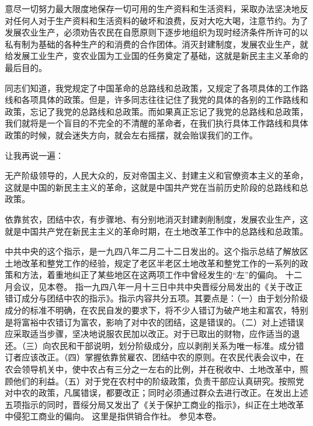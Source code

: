 意尽一切努力最大限度地保存一切可用的生产资料和生活资料，采取办法坚决地反对任何人对于生产资料和生活资料的破坏和浪费，反对大吃大喝，注意节约。为了发展农业生产，必须劝告农民在自愿原则下逐步地组织为现时经济条件所许可的以私有制为基础的各种生产的和消费的合作团体。消灭封建制度，发展农业生产，就给发展工业生产，变农业国为工业国的任务奠定了基础，这就是新民主主义革命的最后目的。

同志们知道，我党规定了中国革命的总路线和总政策，又规定了各项具体的工作路线和各项具体的政策。但是，许多同志往往记住了我党的具体的各别的工作路线和政策，忘记了我党的总路线和总政策。而如果真正忘记了我党的总路线和总政策，我们就将是一个盲目的不完全的不清醒的革命者，在我们执行具体工作路线和具体政策的时候，就会迷失方向，就会左右摇摆，就会贻误我们的工作。

让我再说一遍：

无产阶级领导的，人民大众的，反对帝国主义、封建主义和官僚资本主义的革命，这就是中国的新民主主义的革命，这就是中国共产党在当前历史阶段的总路线和总政策。

依靠贫农，团结中农，有步骤地、有分别地消灭封建剥削制度，发展农业生产，这就是中国共产党在新民主主义的革命时期，在土地改革工作中的总路线和总政策。


\begin{maonote}
中共中央的这个指示，是一九四八年二月二十二日发出的。这个指示总结了解放区土地改革和整党工作的经验，规定了老区半老区土地改革和整党工作的一系列的政策和方法，着重地纠正了某些地区在这两项工作中曾经发生的“左”的偏向。
十二月会议，见本卷。
指一九四八年一月十三日中共中央晋绥分局发出的《关于改正错订成分与团结中农的指示》。指示内容共分五项。其要点是：（一）由于划分阶级成分的标准不明确，在农民自发的要求下，将不少人错订为破产地主和富农，特别是将富裕中农错订为富农，影响了对中农的团结，这是错误的。（二）对上述错误应采取适当步骤，坚决地说服农民加以改正。对于已取出的财物，应作适当的退还。（三）向农民和干部说明，划分阶级成分，应以剥削关系为唯一标准。成分错订者应该改正。（四）掌握依靠贫雇农、团结中农的原则。在农民代表会议中，在农会领导机关中，使中农占有三分之一左右的比例，并在税收中、土地改革中，照顾他们的利益。（五）对于党在农村中的阶级政策，负责干部应认真研究。按照党对中农的政策，凡属错误，都要改正；同时必须通过群众去进行改正。在发出上述五项指示的同时，晋绥分局又发出了《关于保护工商业的指示》，纠正在土地改革中侵犯工商业的偏向。
这里是指供销合作社。
参见本卷。
\end{maonote}
